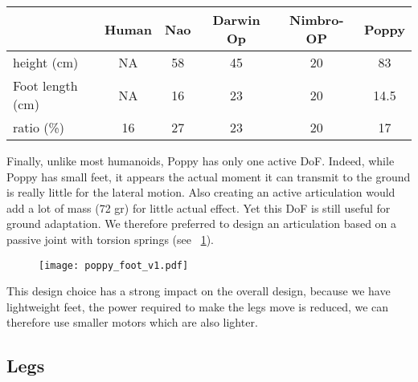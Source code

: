 \begin{table}[!ht]
\centering
\begin{tabular}{l| c c c c c}
    & Human & Nao & Darwin Op & Nimbro-OP & Poppy \\
    \hline
    height (cm) & NA & 58 & 45 & 20 & 83\\
    Foot length (cm) & NA & 16 & 23 & 20 & 14.5\\
    ratio (\%) & 16 & 27 & 23 & 20 & 17\\
\end{tabular}
\caption{}
\label{tab:poppy_feet_compare}
\end{table}

Finally, unlike most humanoids, Poppy has only one active DoF. Indeed, while Poppy has small feet, it appears the actual moment it can transmit to the ground is really little for the lateral motion. Also creating an active articulation would add a lot of mass (72 gr) for little actual effect. Yet this DoF is still useful for ground adaptation. We therefore preferred to design an articulation based on a passive joint with torsion springs (see \figurename~\ref{fig:poppy-foot-v1-design}).



\begin{figure}[p]
    \centering
        \texttt{[image: poppy\_foot\_v1.pdf]}
    \caption{}
    \label{fig:poppy-foot-v1-design}
\end{figure}


This design choice has a strong impact on the overall design, because we have lightweight feet, the power required to make the legs move is reduced, we can therefore use smaller motors which are also lighter.


\subsection{Legs} %
\label{sec:poppy-leg-design}

